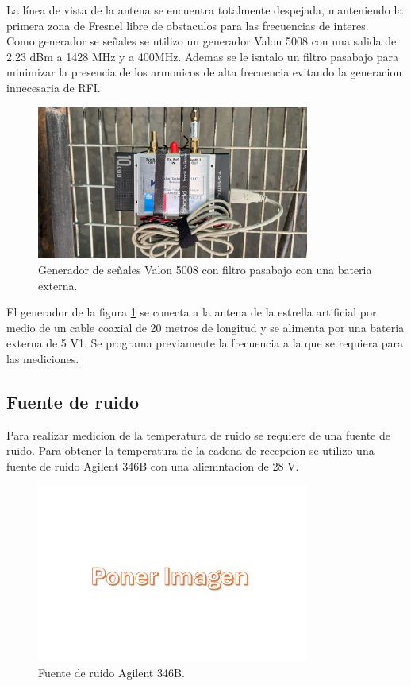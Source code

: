 La línea de vista de la antena se encuentra totalmente despejada, manteniendo la primera zona de Fresnel libre de obstaculos para las frecuencias de interes.\\

Como generador se señales se utilizo un generador Valon 5008 con una salida de 2.23 dBm a 1428 MHz y a 400MHz. Ademas se le isntalo un filtro pasabajo para minimizar la presencia de los armonicos de alta frecuencia evitando la generacion innecesaria de RFI.\\

\begin{figure}
    \centering
    \includegraphics[width=0.8\textwidth]{img/valon}
    \caption{Generador de señales Valon 5008 con filtro pasabajo con una bateria externa.}
    \label{fig:generador}
\end{figure}

El generador de la figura \ref{fig:generador} se conecta a la antena de la estrella artificial por medio de un cable coaxial de 20 metros de longitud y se alimenta por una bateria externa de 5 V1. Se programa previamente la frecuencia a la que se requiera para las mediciones.\\

\subsection{Fuente de ruido}

Para realizar medicion de la temperatura de ruido se requiere de una fuente de ruido. Para obtener la temperatura de la cadena de recepcion se utilizo una fuente de ruido Agilent 346B con una aliemntacion de 28 V.\\

\begin{figure}
    \centering
    \includegraphics[width=0.8\textwidth]{img/imagen}
    \caption{Fuente de ruido Agilent 346B.}
    \label{fig:fuente_ruido}
\end{figure}

